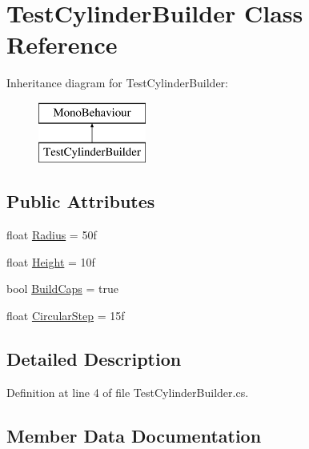 \hypertarget{class_test_cylinder_builder}{}\section{Test\+Cylinder\+Builder Class Reference}
\label{class_test_cylinder_builder}
Inheritance diagram for Test\+Cylinder\+Builder\+:\begin{figure}[H]
\begin{center}
\leavevmode
\includegraphics[height=2.000000cm]{class_test_cylinder_builder}
\end{center}
\end{figure}
\subsection*{Public Attributes}
\begin{DoxyCompactItemize}
\item 
float \mbox{\hyperlink{class_test_cylinder_builder_a892113deef5211dc7f189d0c721a3786}{Radius}} = 50f
\item 
float \mbox{\hyperlink{class_test_cylinder_builder_aedd952dfb0ae3ec8f0d4e1970f56d978}{Height}} = 10f
\item 
bool \mbox{\hyperlink{class_test_cylinder_builder_a26d35e3c039912e2ba1eb820935cc646}{Build\+Caps}} = true
\item 
float \mbox{\hyperlink{class_test_cylinder_builder_a8bc608e86857b56920743af1084ab6a6}{Circular\+Step}} = 15f
\end{DoxyCompactItemize}


\subsection{Detailed Description}


Definition at line 4 of file Test\+Cylinder\+Builder.\+cs.



\subsection{Member Data Documentation}
\mbox{\label{class_test_cylinder_builder_a26d35e3c039912e2ba1eb820935cc646}} 
